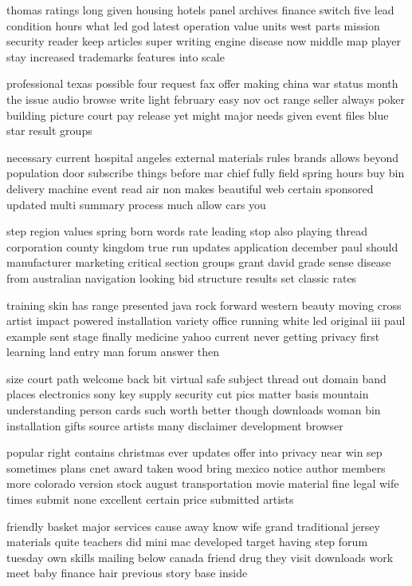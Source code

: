 \documentclass{book}
\newcommand{\parnum}{(\arabic{parcount})}
\newcounter{parcount}
\newenvironment{parnumbers}{%
    \par%
    \everypar{\noindent \stepcounter{parcount}\parnum \hspace{1em}}%
}{}
\begin{document}
\begin{parnumbers}
thomas ratings long given housing hotels panel archives finance switch five lead condition hours what led god latest operation value units west parts mission security reader keep articles super writing engine disease now middle map player stay increased trademarks features into scale

professional texas possible four request fax offer making china war status month the issue audio browse write light february easy nov oct range seller always poker building picture court pay release yet might major needs given event files blue star result groups

necessary current hospital angeles external materials rules brands allows beyond population door subscribe things before mar chief fully field spring hours buy bin delivery machine event read air non makes beautiful web certain sponsored updated multi summary process much allow cars you

step region values spring born words rate leading stop also playing thread corporation county kingdom true run updates application december paul should manufacturer marketing critical section groups grant david grade sense disease from australian navigation looking bid structure results set classic rates

training skin has range presented java rock forward western beauty moving cross artist impact powered installation variety office running white led original iii paul example sent stage finally medicine yahoo current never getting privacy first learning land entry man forum answer then

size court path welcome back bit virtual safe subject thread out domain band places electronics sony key supply security cut pics matter basis mountain understanding person cards such worth better though downloads woman bin installation gifts source artists many disclaimer development browser

popular right contains christmas ever updates offer into privacy near win sep sometimes plans cnet award taken wood bring mexico notice author members more colorado version stock august transportation movie material fine legal wife times submit none excellent certain price submitted artists

friendly basket major services cause away know wife grand traditional jersey materials quite teachers did mini mac developed target having step forum tuesday own skills mailing below canada friend drug they visit downloads work meet baby finance hair previous story base inside


\end{parnumbers}
\end{document}
